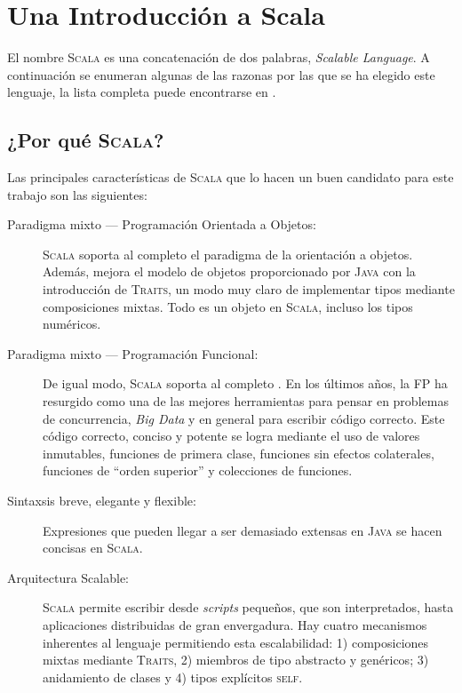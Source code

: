 \chapter{Una Introducción a Scala}
\label{ch:scalaintro}

El nombre \textsc{Scala} es una concatenación de dos palabras, \emph{Scalable
  Language}. A continuación se enumeran algunas de las razonas por las que se ha
elegido este lenguaje, la lista completa puede encontrarse en
\citeauthor{Dean2015} \cite{Dean2015}.

\section{¿Por qué \textsc{Scala}?}
\label{sec:whyscala}

Las principales características de \textsc{Scala} que lo hacen un buen candidato
para este trabajo son las siguientes:

\begin{description}
\item[Paradigma mixto --- Programación Orientada a Objetos:] \textsc{Scala}
  soporta al completo el paradigma de la orientación a objetos. Además, mejora
  el modelo de objetos proporcionado por \textsc{Java} con la introducción de
  \textsc{Traits}, un modo muy claro de implementar tipos mediante composiciones
  mixtas. Todo es un objeto en \textsc{Scala}, incluso los tipos numéricos.
\item [Paradigma mixto --- Programación Funcional:] De igual modo, \textsc{Scala}
  soporta al completo . En los últimos años, la \ac{FP} ha resurgido como una de las
  mejores herramientas para pensar en problemas de concurrencia, \emph{Big Data}
  y en general para escribir código correcto. Este
  código correcto, conciso y potente se logra mediante el uso de valores
  inmutables, funciones de primera clase, funciones sin efectos colaterales,
  funciones de ``orden superior'' y colecciones de funciones.
\item [Sintaxsis breve, elegante y flexible:] Expresiones que pueden llegar a
  ser demasiado extensas en \textsc{Java} se hacen concisas en \textsc{Scala}.
\item [Arquitectura Scalable:] \textsc{Scala} permite escribir desde
  \emph{scripts} pequeños, que son interpretados, hasta aplicaciones
  distribuidas de gran envergadura. Hay cuatro mecanismos inherentes al lenguaje
  permitiendo esta escalabilidad: 1) composiciones mixtas mediante
  \textsc{Traits}, 2) miembros de tipo abstracto y genéricos; 3) anidamiento de
  clases y 4) tipos explícitos \textsc{self}.
\end{description}

